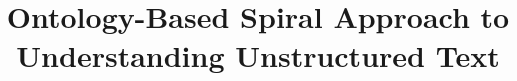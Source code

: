 \documentclass{sig-alternate}
\begin{document}
%
%
\title{Ontology-Based Spiral Approach to Understanding Unstructured Text}




%
\author{
%
%
}
\end{document}
